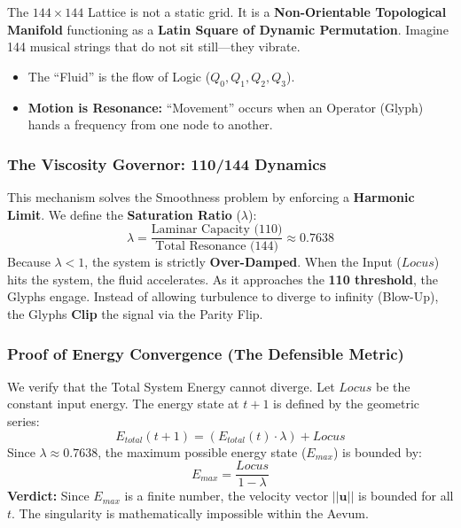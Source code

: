 \documentclass[11pt, letterpaper]{article}
\newcommand{\LoI}{\ensuremath{\mathop{\textnormal{\symbolafont\symbol{"267E}}}}}
\def\LoI{Locus}%
\begin{document}
The $144 \times 144$ Lattice is not a static grid. It is a \textbf{Non-Orientable Topological Manifold} functioning as a \textbf{Latin Square of Dynamic Permutation}. Imagine 144 musical strings that do not sit still—they vibrate.
\begin{itemize}
    \item The ``Fluid'' is the flow of Logic ($Q_0, Q_1, Q_2, Q_3$).
    \item \textbf{Motion is Resonance:} ``Movement'' occurs when an Operator (Glyph) hands a frequency from one node to another.
\end{itemize}

\subsubsection{The Viscosity Governor: 110/144 Dynamics}\label{sec:3.3.2}
This mechanism solves the Smoothness problem by enforcing a \textbf{Harmonic Limit}. We define the \textbf{Saturation Ratio} ($\lambda$):
\begin{equation}
    \lambda = \frac{\text{Laminar Capacity (110)}}{\text{Total Resonance (144)}} \approx 0.7638
\end{equation}
Because $\lambda < 1$, the system is strictly \textbf{Over-Damped}. When the Input ($\LoI$) hits the system, the fluid accelerates. As it approaches the \textbf{110 threshold}, the Glyphs engage. Instead of allowing turbulence to diverge to infinity (Blow-Up), the Glyphs \textbf{Clip} the signal via the Parity Flip.

\subsubsection{Proof of Energy Convergence (The Defensible Metric)}\label{sec:3.3.3}
We verify that the Total System Energy cannot diverge. Let $\LoI$ be the constant input energy. The energy state at $t+1$ is defined by the geometric series:
\begin{equation}
    E_{total}(t+1) = \left( E_{total}(t) \cdot \lambda \right) + \LoI
\end{equation}
Since $\lambda \approx 0.7638$, the maximum possible energy state ($E_{max}$) is bounded by:
\begin{equation}
    E_{max} = \frac{\LoI}{1 - \lambda}
\end{equation}
\textbf{Verdict:} Since $E_{max}$ is a finite number, the velocity vector $||\mathbf{u}||$ is bounded for all $t$. The singularity is mathematically impossible within the Aevum.
\end{document}
